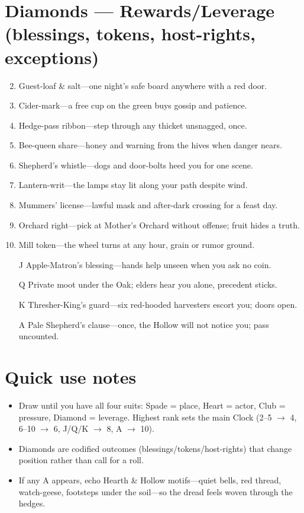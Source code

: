 \section*{Diamonds --- Rewards/Leverage (blessings, tokens, host-rights, exceptions)}
\label{sec:aelaerem-rewards}
\begin{enumerate}
\setcounter{enumi}{1}
\item Guest-loaf \& salt---one night's safe board anywhere with a red door.
\item Cider-mark---a free cup on the green buys gossip and patience.
\item Hedge-pass ribbon---step through any thicket unsnagged, once.
\item Bee-queen share---honey and warning from the hives when danger nears.
\item Shepherd's whistle---dogs and door-bolts heed you for one scene.
\item Lantern-writ---the lamps stay lit along your path despite wind.
\item Mummers' license---lawful mask and after-dark crossing for a feast day.
\item Orchard right---pick at Mother's Orchard without offense; fruit hides a truth.
\item Mill token---the wheel turns at any hour, grain or rumor ground.
\item[J] Apple-Matron's blessing---hands help unseen when you ask no coin.
\item[Q] Private moot under the Oak; elders hear you alone, precedent sticks.
\item[K] Thresher-King's guard---six red-hooded harvesters escort you; doors open.
\item[A] Pale Shepherd's clause---once, the Hollow will not notice you; pass uncounted.
\end{enumerate}

\section*{Quick use notes}
\label{sec:aelaerem-quick-use}
\begin{itemize}
\item Draw until you have all four suits: Spade = place, Heart = actor, Club = pressure, Diamond = leverage. Highest rank sets the main Clock (2--5 $\rightarrow$ 4, 6--10 $\rightarrow$ 6, J/Q/K $\rightarrow$ 8, A $\rightarrow$ 10).
\item Diamonds are codified outcomes (blessings/tokens/host-rights) that change position rather than call for a roll.
\item If any A appears, echo Hearth \& Hollow motifs---quiet bells, red thread, watch-geese, footsteps under the soil---so the dread feels woven through the hedges.
\end{itemize}

